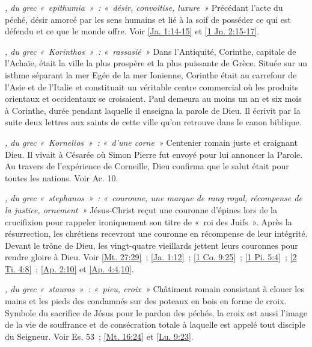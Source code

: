 \begin{multicols}{2}
\textit{, du grec «~epithumia~»~: «~désir, convoitise, luxure~»}\newline
Précédant l'acte du péché, désir amorcé par les sens humains et lié à la soif de posséder ce qui est défendu et ce que le monde offre. Voir \vref{Ja. 1:14-15} et \vref{1 Jn. 2:15-17}.

\textit{, du grec «~Korinthos~»~: «~rassasié~»}\newline
Dans l'Antiquité, Corinthe, capitale de l'Achaïe, était la ville la plus prospère et la plus puissante de Grèce. Située sur un isthme séparant la mer Egée de la mer Ionienne, Corinthe était au carrefour de l'Asie et de l'Italie et constituait un véritable centre commercial où les produits orientaux et occidentaux se croisaient. Paul demeura au moins un an et six mois à Corinthe, durée pendant laquelle il enseigna la parole de Dieu. Il écrivit par la suite deux lettres aux saints de cette ville qu'on retrouve dans le canon biblique.

\textit{, du grec «~Kornelios~»~: «~d'une corne~»}\newline
Centenier romain juste et craignant Dieu. Il vivait à Césarée où Simon Pierre fut envoyé pour lui annoncer la Parole. Au travers de l'expérience de Corneille, Dieu confirma que le salut était pour toutes les nations. Voir Ac. 10.

\textit{, du grec «~stephanos~»~: «~couronne, une marque de rang royal, récompense de la justice, ornement~»}\newline
Jésus-Christ reçut une couronne d'épines lors de la crucifixion pour rappeler ironiquement son titre de «~roi des Juifs~». Après la résurrection, les chrétiens recevront une couronne en récompense de leur intégrité. Devant le trône de Dieu, les vingt-quatre vieillards jettent leurs couronnes pour rendre gloire à Dieu. Voir \vref{Mt. 27:29}~; \vref{Ja. 1:12}~; \vref{1 Co. 9:25}~; \vref{1 Pi. 5:4}~; \vref{2 Ti. 4:8}~; \vref{Ap. 2:10} et \vref{Ap. 4:4,10}.

\textit{, du grec «~stauros~»~: «~pieu, croix~»}\newline
Châtiment romain consistant à clouer les mains et les pieds des condamnés sur des poteaux en bois en forme de croix. Symbole du sacrifice de Jésus pour le pardon des péchés, la croix est aussi l'image de la vie de souffrance et de consécration totale à laquelle est appelé tout disciple du Seigneur. Voir Es. 53~; \vref{Mt. 16:24} et \vref{Lu. 9:23}.


\end{multicols}
